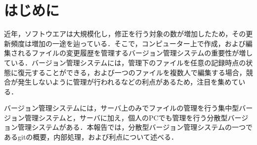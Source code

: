\documentclass[a4paper,9pt,twocolumn]{jsarticle}
\begin{document}


\section{はじめに}
近年，ソフトウエアは大規模化し，修正を行う対象の数が増加したため，その更新頻度は増加の一途を辿っている．そこで，コンピューター上で作成，および編集されるファイルの変更履歴を管理するバージョン管理システムの重要性が増している．バージョン管理システムには，管理下のファイルを任意の記録時点の状態に復元することができる，および一つのファイルを複数人で編集する場合，競合が発生しないように管理が行われるなどの利点があるため，注目を集めている．

バージョン管理システムには，サーバ上のみでファイルの管理を行う集中型バージョン管理システムと，サーバに加え，個人のPCでも管理を行う分散型バージョン管理システムがある．本報告では，分散型バージョン管理システムの一つであるgitの概要，内部処理，および利点について述べる．
\end{document}

